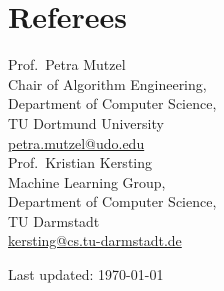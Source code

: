 \documentclass[11pt, a4paper]{scrartcl}
\begin{document}
\section*{Referees}
Prof.~Petra Mutzel\\
Chair of Algorithm Engineering,\\ 
Department of Computer Science,\\
TU Dortmund University\\
\href{mailto:petra.mutzel@udo.edu}{petra.mutzel@udo.edu}\\


Prof.~Kristian Kersting\\ 
Machine Learning Group,\\
Department of Computer Science,\\
TU Darmstadt\\
\href{mailto:kersting@cs.tu-darmstadt.de}{kersting@cs.tu-darmstadt.de}\\

\vfill{} 
\begin{center}
{\scriptsize Last updated: \today}
\end{center}
\end{document}
